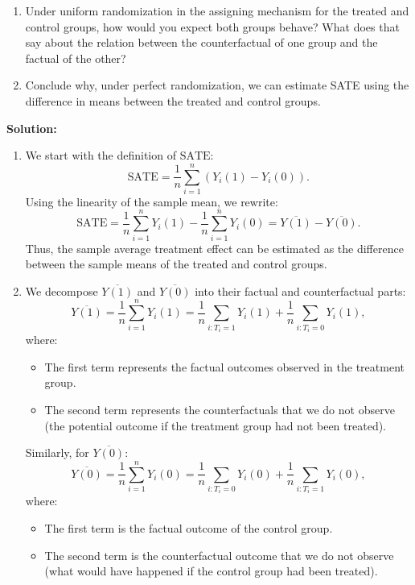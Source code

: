 \documentclass[12pt]{article}
\newif\ifsolutions
\begin{document}
\begin{enumerate}
\begin{enumerate}[label=(\alph*)]
    \item Under uniform randomization in the assigning mechanism for the treated and control groups, how would you expect both groups behave? What does that say about the relation between the counterfactual of one group and the factual of the other? 
    
    \item Conclude why, under perfect randomization, we can estimate SATE using the difference in means between the treated and control groups.
\end{enumerate}

\ifsolutions \color{blue} \textbf{Solution:} \\

\begin{enumerate}[label=(\alph*)]
    \item We start with the definition of $\mathrm{SATE}$:
    \[
    \mathrm{SATE} = \frac{1}{n} \sum_{i=1}^{n} (Y_i(1) - Y_i(0)).
    \]
    Using the linearity of the sample mean, we rewrite:
    \[
    \mathrm{SATE} = \frac{1}{n} \sum_{i=1}^{n} Y_i(1) - \frac{1}{n} \sum_{i=1}^{n} Y_i(0) = \overline{Y(1)} - \overline{Y(0)}.
    \]
    Thus, the sample average treatment effect can be estimated as the difference between the sample means of the treated and control groups.

    \item We decompose $\overline{Y(1)}$ and $\overline{Y(0)}$ into their factual and counterfactual parts:
    \[
    \overline{Y(1)} = \frac{1}{n} \sum_{i=1}^{n} Y_i(1) = \frac{1}{n} \sum_{i:T_i=1} Y_i(1) + \frac{1}{n} \sum_{i:T_i=0} Y_i(1),
    \]
    where:
    \begin{itemize}
        \item The first term represents the factual outcomes observed in the treatment group.
        \item The second term represents the counterfactuals that we do not observe (the potential outcome if the treatment group had not been treated).
    \end{itemize}
    Similarly, for $\overline{Y(0)}$:
    \[
    \overline{Y(0)} = \frac{1}{n} \sum_{i=1}^{n} Y_i(0) = \frac{1}{n} \sum_{i:T_i=0} Y_i(0) + \frac{1}{n} \sum_{i:T_i=1} Y_i(0),
    \]
    where:
    \begin{itemize}
        \item The first term is the factual outcome of the control group.
        \item The second term is the counterfactual outcome that we do not observe (what would have happened if the control group had been treated).
    \end{itemize}


\end{enumerate}
\end{enumerate}
\end{document}
